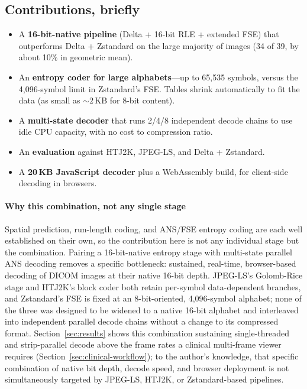 \documentclass[journal]{IEEEtran}
\begin{document}
\subsection{Contributions, briefly}

\begin{itemize}
  \item A \textbf{16-bit-native pipeline} (Delta + 16-bit RLE + extended FSE)
  that outperforms Delta + Zstandard on the large majority of images (34 of 39,
  by about 10\% in geometric mean).
  \item An \textbf{entropy coder for large alphabets}---up to 65,535 symbols,
  versus the 4,096-symbol limit in Zstandard's FSE. Tables shrink
  automatically to fit the data (as small as ${\sim}2$\,KB for 8-bit content).
  \item A \textbf{multi-state decoder} that runs 2/4/8 independent decode chains
  to use idle CPU capacity, with no cost to compression ratio.
  \item An \textbf{evaluation} against HTJ2K, JPEG-LS, and Delta + Zstandard.
  \item A \textbf{20\,KB JavaScript decoder} plus a WebAssembly build, for
  client-side decoding in browsers.
\end{itemize}

\paragraph{Why this combination, not any single stage} Spatial prediction,
run-length coding, and ANS/FSE entropy coding are each well established on
their own, so the contribution here is not any individual stage but the
combination. Pairing a 16-bit-native entropy stage with multi-state parallel
ANS decoding removes a specific bottleneck: sustained, real-time,
browser-based decoding of DICOM images at their native 16-bit depth. JPEG-LS's
Golomb-Rice stage and HTJ2K's block coder both retain per-symbol
data-dependent branches, and Zstandard's FSE is fixed at an 8-bit-oriented,
4,096-symbol alphabet; none of the three was designed to be widened to a
native 16-bit alphabet and interleaved into independent parallel decode chains
without a change to its compressed format. Section~\ref{sec:results} shows
this combination sustaining single-threaded and strip-parallel decode above
the frame rates a clinical multi-frame viewer requires
(Section~\ref{sec:clinical-workflow}); to the author's knowledge, that specific
combination of native bit depth, decode speed, and browser deployment is not
simultaneously targeted by JPEG-LS, HTJ2K, or Zstandard-based pipelines.
\end{document}
